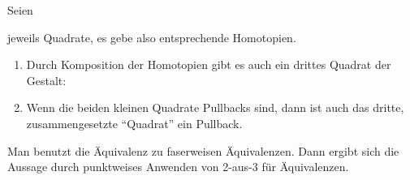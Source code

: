 \begin{theorem}
  Seien
  \begin{center}
  \end{center}
  jeweils Quadrate, es gebe also entsprechende Homotopien.
  \begin{enumerate}
  \item  Durch Komposition der Homotopien gibt es auch ein drittes Quadrat der Gestalt:
    \begin{center}
    \end{center}
  \item Wenn die beiden kleinen Quadrate Pullbacks sind, dann ist auch das dritte, zusammengesetzte ``Quadrat'' ein Pullback.
  \end{enumerate}
\end{theorem}
\begin{beweis}
  Man benutzt die Äquivalenz zu faserweisen Äquivalenzen. Dann ergibt sich die Aussage durch punktweises Anwenden von 2-aus-3 für Äquivalenzen.
\end{beweis}

